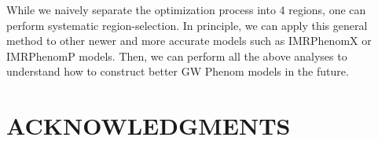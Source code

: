 \documentclass[twocolumn]{aastex631}
\begin{document}
While we naively separate the optimization process into 4 regions, one can
perform systematic region-selection. In principle, we can apply this general
method to other newer and more accurate models such as IMRPhenomX or IMRPhenomP
models. Then, we can perform all the above analyses to understand how to
construct better GW Phenom models in the future.  



\section{ACKNOWLEDGMENTS}



\end{document}
